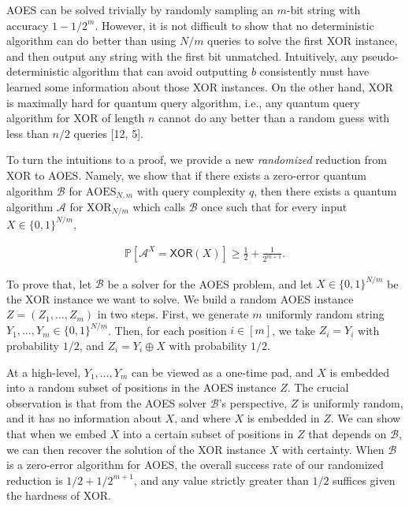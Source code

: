 \documentclass[10pt,a4paper]{article}
\begin{document}
AOES can be solved trivially by randomly sampling an $m$-bit string with accuracy $1-1/2^{m}$. However, it is not difficult to show that no deterministic algorithm can do better than using $N/m$ queries to solve the first XOR instance, and then output any string with the first bit unmatched.
Intuitively, any pseudo-deterministic algorithm that can avoid outputting $b$ consistently must have learned some information about those XOR instances. On the other hand, XOR is maximally hard for quantum query algorithm, i.e., any quantum query algorithm for XOR of length $n$ cannot do any better than a random guess with less than $n/2$ queries [12, 5].\par




To turn the intuitions to a proof, we provide a new \emph{randomized} reduction from XOR to AOES. Namely, we show that if there exists a zero-error quantum algorithm $\mathcal{B}$ for ${\text{AOES}}_{N,m}$ with query complexity $q$, then there exists a quantum algorithm $\mathcal{A}$ for ${\text{XOR}}_{N/m}$ which calls $\mathcal{B}$ once such that for every input $X\in\{0,1\}^{N/m}$,\par


\[\begin{gathered}
\mathbb{P}\left[\mathcal{A}^{X}=\mathsf{XOR}(X)\right]\geq\frac{1}{2}+\frac{1}{2^{m+1}}.
\end{gathered}\]




To prove that, let $\mathcal{B}$ be a solver for the AOES problem, and let $X\in\{0,1\}^{N/m}$ be the XOR instance we want to solve. We build a random AOES instance $Z=(Z_{1},\ldots,Z_{m})$ in two steps. First, we generate $m$ uniformly random string $Y_{1},\ldots,Y_{m}\in\{0,1\}^{N/m}$. Then, for each position $i\in[m]$, we take $Z_{i}=Y_{i}$ with probability $1/2$, and $Z_{i}=Y_{i}\oplus X$ with probability $1/2$.\par




At a high-level, $Y_{1},\ldots,Y_{m}$ can be viewed as a one-time pad, and $X$ is embedded into a random subset of positions in the AOES instance $Z$. The crucial observation is that from the AOES solver $\mathcal{B}$’s perspective, $Z$ is uniformly random, and it has no information about $X$, and where $X$ is embedded in $Z$.
We can show that when we embed $X$ into a certain subset of positions in $Z$ that depends on $\mathcal{B}$, we can then recover the solution of the XOR instance $X$ with certainty. When $\mathcal{B}$ is a zero-error algorithm for AOES, the overall success rate of our randomized reduction is $1/2+1/2^{m+1}$, and any value strictly greater than $1/2$ suffices given the hardness of XOR.\par
\end{document}
